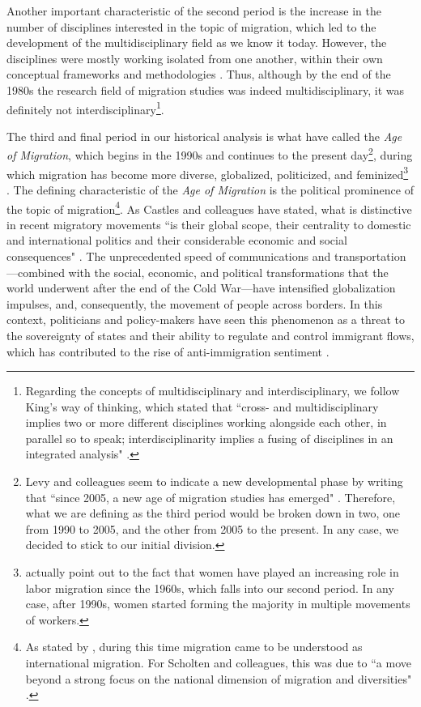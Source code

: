 Another important characteristic of the second period is the increase in the number of disciplines interested in the topic of migration, which led to the development of the multidisciplinary field as we know it today. However, the disciplines were mostly working isolated from one another, within their own conceptual frameworks and methodologies \citep{levy_between_2020, scholten_introduction_2022}. Thus, although by the end of the 1980s the research field of migration studies was indeed multidisciplinary, it was definitely not interdisciplinary\footnote{Regarding the concepts of multidisciplinary and interdisciplinary, we follow King's way of thinking, which stated that ``cross- and multidisciplinary implies two or more different disciplines working alongside each other, in parallel so to speak; interdisciplinarity implies a fusing of disciplines in an integrated analysis" \citep[p. 10]{king_theories_2012}.}.

The third and final period in our historical analysis is what \cite{castles_migration_2014} have called the \textit{Age of Migration}, which begins in the 1990s and continues to the present day\footnote{Levy and colleagues seem to indicate a new developmental phase by writing that ``since 2005, a new age of migration studies has emerged" \citep[p. 17]{levy_between_2020}. Therefore, what we are defining as the third period would be broken down in two, one from 1990 to 2005, and the other from 2005 to the present. In any case, we decided to stick to our initial division.}, during which migration has become more diverse, globalized, politicized, and feminized\footnote{\cite{castles_migration_2014} actually point out to the fact that women have played an increasing role in labor migration since the 1960s, which falls into our second period. In any case, after 1990s, women started forming the majority in multiple movements of workers.} \citep{king_theories_2012, castles_migration_2014}. The defining characteristic of the \textit{Age of Migration} is the political prominence of the topic of migration\footnote{As stated by \cite{king_mind_2010}, during this time migration came to be understood as international migration. For Scholten and colleagues, this was due to ``a move beyond a strong focus on the national dimension of migration and diversities" \citep[p. 16]{scholten_introduction_2022}.}. As Castles and colleagues have stated, what is distinctive in recent migratory movements ``is their global scope, their centrality to domestic and international politics and their considerable economic and social consequences" \citep[p. 6]{castles_migration_2014}. The unprecedented speed of communications and transportation---combined with the social, economic, and political transformations that the world underwent after the end of the Cold War---have intensified globalization impulses, and, consequently, the movement of people across borders. In this context, politicians and policy-makers have seen this phenomenon as a threat to the sovereignty of states and their ability to regulate and control immigrant flows, which has contributed to the rise of anti-immigration sentiment \citep{martiniello_introduction_2012, castles_migration_2014}.


